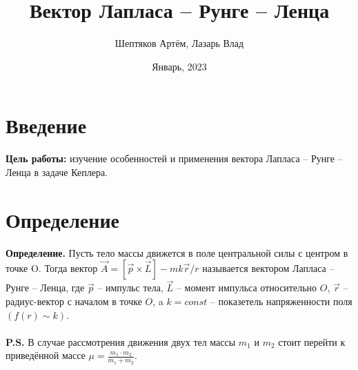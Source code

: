 \documentclass[a4paper,12pt]{article}
\title{\textbf{Вектор Лапласа -- Рунге -- Ленца}}
\author{Шептяков Артём, Лазарь Влад}
\date{Январь, 2023}
\begin{document}
\maketitle
\newpage

\section*{Введение}
\addtocounter{section}{1}
\textbf{Цель работы:}
изучение особенностей и применения вектора Лапласа -- Рунге -- Ленца в задаче Кеплера.

\section*{Определение}
\addtocounter{section}{1}
\textbf{Определение.} Пусть тело массы движется в поле центральной силы с центром в точке O. Тогда вектор $\vec{A} = [\vec{p} \times \vec{L}] - mk\vec{r}/{r}$ называется вектором Лапласа -- Рунге -- Ленца, где $\vec{p}$ -- импульс тела, $\vec{L}$ -- момент импульса относительно $O$, $\vec{r}$ -- радиус-вектор с началом в точке $O$, a $k = const$ -- показетель напряженности поля $(f(r) \sim k)$.\\\\
\textbf{P.S.} В случае рассмотрения движения двух тел массы $m_1$ и $m_2$ стоит перейти к приведённой массе $\mu = \frac{m_1\cdot m_2}{m_1 + m_2}$.
\end{document}
